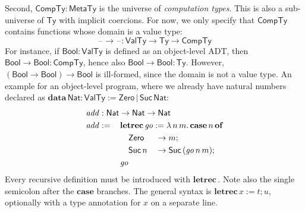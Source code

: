 \documentclass[acmsmall,screen,review,anonymous]{acmart}
\newcommand{\mit}[1]{\mathit{#1}}
\newcommand{\msf}[1]{\mathsf{#1}}
\newcommand{\mbf}[1]{\mathbf{#1}}
\newcommand{\bs}[1]{\boldsymbol{#1}}
\newcommand{\ind}{\hspace{1em}}
\newcommand{\lam}{\lambda\,}
\newcommand{\data}{\mbf{data}\,}
\newcommand{\letrec}{\mbf{letrec}\,}
\newcommand{\of}{\mbf{of}\,}
\newcommand{\go}{\mit{go}}
\newcommand{\add}{\mit{add}}
\newcommand{\Bool}{\msf{Bool}}
\newcommand{\case}{\mbf{case\,}}
\newcommand{\MTy}{\msf{MetaTy}}
\newcommand{\VTy}{\msf{ValTy}}
\newcommand{\Ty}{\msf{Ty}}
\newcommand{\CTy}{\msf{CompTy}}
\newcommand{\blank}{{\mathord{\hspace{1pt}\text{--}\hspace{1pt}}}}
\newcommand{\Nat}{\msf{Nat}}
\newcommand{\Zero}{\msf{Zero}}
\newcommand{\Suc}{\msf{Suc}}
\begin{document}
Second, $\bs{\CTy} : \MTy$ is the universe of \emph{computation types}. This is
also a sub-universe of $\Ty$ with implicit coercions. For now, we only specify
that $\CTy$ contains functions whose domain is a value type:
\[ \blank\to\blank : \VTy \to \Ty \to \CTy \]
For instance, if $\Bool : \VTy$ is defined as an object-level ADT, then $\Bool
\to \Bool : \CTy$, hence also $\Bool \to \Bool : \Ty$. However, $(\Bool \to
\Bool) \to \Bool$ is ill-formed, since the domain is not a value type. An
example for an object-level program, where we already have natural numbers
declared as $\data \Nat : \VTy := \Zero\,|\,\Suc\,\Nat$:
\begin{alignat*}{3}
  &\rlap{$\add : \Nat \to \Nat \to \Nat$}\\
  &\add :=\,&& \mathrlap{\letrec \go := \lam n\,m.\,\case n\,\of}\\
  &         && \ind \Zero   &&\to m;\\
  &         && \ind \Suc\,n &&\to \Suc\,(\go\,n\,m);\\
  &         && \go
\end{alignat*}
Every recursive definition must be introduced with $\letrec$. Note also the
single semicolon after the $\mbf{case}$ branches. The general syntax is $\letrec x :=
t; u$, optionally with a type annotation for $x$ on a separate line.
\end{document}
